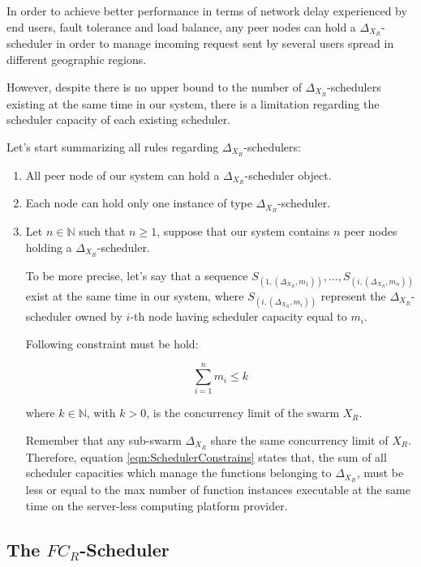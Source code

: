 \documentclass[10pt,a4paper]{article}
\theoremstyle{definition}
\begin{document}
In order to achieve better performance in terms of network delay experienced by end users, fault tolerance and load balance, any peer nodes can hold a $\Delta_{X_{R}}$-scheduler in order to manage incoming request sent by several users spread in different geographic regions. 

However, despite there is no upper bound to the number of $\Delta_{X_{R}}$-schedulers existing at the same time in our system, there is a limitation regarding the scheduler capacity of each existing scheduler. 

Let's start summarizing all rules regarding $\Delta_{X_{R}}$-schedulers:

\begin{enumerate}

\item All peer node of our system can hold a $\Delta_{X_{R}}$-scheduler object.

\item Each node can hold only one instance of type $\Delta_{X_{R}}$-scheduler.

\item Let $n \in \mathbb{N}$ such that $n \geq 1$, suppose that our system contains $n$ peer nodes holding a $\Delta_{X_{R}}$-scheduler.

To be more precise, let's say that a sequence $S_{(1,(\Delta_{X_{R}},m_1))}, \ldots , S_{(i,(\Delta_{X_{R}},m_n))}$ exist at the same time in our system, where $S_{(i,(\Delta_{X_{R}},m_i))}$ represent the $\Delta_{X_{R}}$-scheduler owned by $i$-th node having scheduler capacity equal to $m_i$.

Following constraint must be hold:

\begin{equation}
\label{eqn:SchedulerConstrains}
\sum_{i=1}^{n} m_i \leq k
\end{equation}

where $k \in \mathbb{N}$, with $k > 0$, is the concurrency limit of the swarm $X_R$.

Remember that any sub-swarm $\Delta_{X_{R}}$ share the same concurrency limit of $X_R$. Therefore, equation \ref{eqn:SchedulerConstrains} states that, the sum of all scheduler capacities which manage the functions belonging to $\Delta_{X_{R}}$, must be less or equal to the max number of function instances executable at the same time on the server-less computing platform provider.

\end{enumerate}

\subsection{The $FC_R$-Scheduler}
\end{document}
